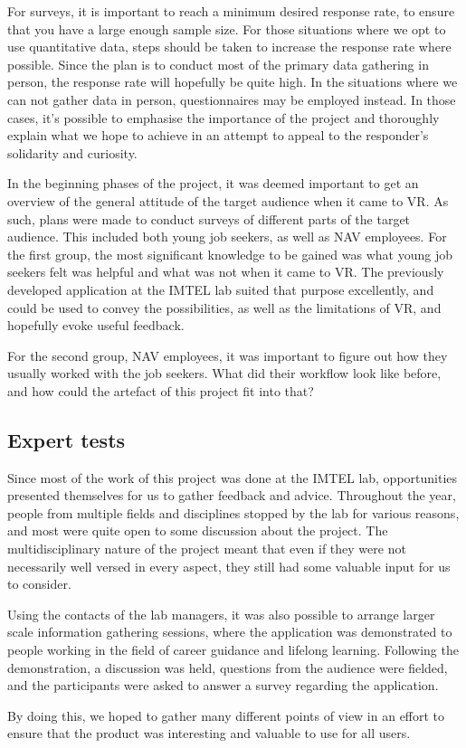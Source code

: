 For surveys, it is important to reach a minimum desired response rate, to ensure that you have a large enough sample size. For those situations where we opt to use quantitative data, steps should be taken to increase the response rate where possible. Since the plan is to conduct most of the primary data gathering in person, the response rate will hopefully be quite high. In the situations where we can not gather data in person, questionnaires may be employed instead. In those cases, it's possible to emphasise the importance of the project and thoroughly explain what we hope to achieve in an attempt to appeal to the responder's solidarity and curiosity. 



In the beginning phases of the project, it was deemed important to get an overview of the general attitude of the target audience when it came to VR. As such, plans were made to conduct surveys of different parts of the target audience. This included both young job seekers, as well as NAV employees. For the first group, the most significant knowledge to be gained was what young job seekers felt was helpful and what was not when it came to VR. The previously developed application at the IMTEL lab suited that purpose excellently, and could be used to convey the possibilities, as well as the limitations of VR, and hopefully evoke useful feedback.

For the second group, NAV employees, it was important to figure out how they usually worked with the job seekers. What did their workflow look like before, and how could the artefact of this project fit into that?


\subsection{Expert tests}
Since most of the work of this project was done at the IMTEL lab, opportunities presented themselves for us to gather feedback and advice. Throughout the year, people from multiple fields and disciplines stopped by the lab for various reasons, and most were quite open to some discussion about the project. The multidisciplinary nature of the project meant that even if they were not necessarily well versed in every aspect, they still had some valuable input for us to consider.

Using the contacts of the lab managers, it was also possible to arrange larger scale information gathering sessions, where the application was demonstrated to people working in the field of career guidance and lifelong learning. Following the demonstration, a discussion was held, questions from the audience were fielded, and the participants were asked to answer a survey regarding the application. 

By doing this, we hoped to gather many different points of view in an effort to ensure that the product was interesting and valuable to use for all users.




\cleardoublepage